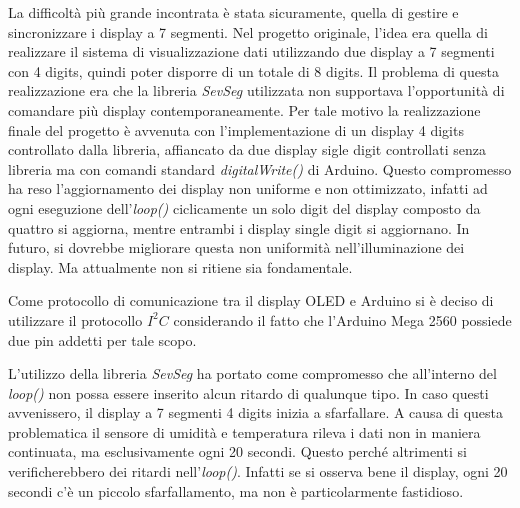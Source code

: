 \documentclass[paper=a4, fontsize=10pt]{scrartcl}
\begin{document}
La difficoltà più grande incontrata è stata sicuramente, quella di gestire e sincronizzare i display a 7 segmenti. Nel progetto originale, l'idea era quella di realizzare il sistema di visualizzazione dati utilizzando due display a 7 segmenti con 4 digits, quindi poter disporre di un totale di 8 digits. Il problema di questa realizzazione era che la libreria \textit{SevSeg} utilizzata non supportava l'opportunità di comandare più display contemporaneamente. Per tale motivo la realizzazione finale del progetto è avvenuta con l'implementazione di un display 4 digits controllato dalla libreria, affiancato da due display sigle digit controllati senza libreria ma con comandi standard \textit{digitalWrite()} di Arduino. Questo compromesso ha reso l'aggiornamento dei display non uniforme e non ottimizzato, infatti ad ogni eseguzione dell'\textit{loop()} ciclicamente un solo digit del display composto da quattro si aggiorna, mentre entrambi i display single digit si aggiornano. In futuro, si dovrebbe migliorare questa non uniformità nell'illuminazione dei display. Ma attualmente non si ritiene sia fondamentale.

Come protocollo di comunicazione tra il display OLED e Arduino si è deciso di utilizzare il protocollo $I^{2}C$ considerando il fatto che l'Arduino Mega 2560 possiede due pin addetti per tale scopo.

L'utilizzo della libreria \textit{SevSeg} ha portato come compromesso che all'interno del \textit{loop()} non possa essere inserito alcun ritardo di qualunque tipo. In caso questi avvenissero, il display a 7 segmenti 4 digits inizia a sfarfallare. A causa di questa problematica il sensore di umidità e temperatura rileva i dati non in maniera continuata, ma esclusivamente ogni 20 secondi. Questo perché altrimenti si verificherebbero dei ritardi nell'\textit{loop()}. Infatti se si osserva bene il display, ogni 20 secondi c'è un piccolo sfarfallamento, ma non è particolarmente fastidioso.
\end{document}
